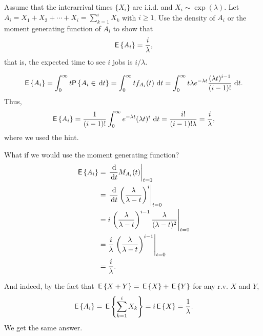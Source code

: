   \begin{question}
    Assume that the interarrival times $\{X_i\}$ are i.i.d. and
    $X_i\sim\exp(\lambda)$. Let
    $A_i=X_1+X_2+\cdots+X_i=\sum_{k=1}^i X_k$ with $i\geq 1$. Use the
    density of $A_i$ or the moment generating function of $A_i$ to
    show that
 \begin{equation*}
\,\mathsf{E}\left\{A_i\right\} = \frac i\lambda,
 \end{equation*}
 that is, the expected time to see $i$ jobs is $i/\lambda$.
  \begin{solution}
  \begin{equation*}
\E{A_i} = \int_0^\infty t \P{A_i \in \d t} = \int_0^\infty t f_{A_i} (t) \, \d t  = 
\int_0^\infty t  \lambda e^{-\lambda t} \frac{(\lambda t)^{i-1}}{(i-1)!}\, \d t.
  \end{equation*}
Thus, 
  \begin{equation*}
\,\mathsf{E}\left\{A_i\right\} = \frac{1}{(i-1)!} \int_0^\infty   e^{-\lambda t} (\lambda t)^i\,\,\text{d}t = \frac{i!}{(i-1)!\lambda}=\frac{i}\lambda,
  \end{equation*}
  where we used the hint.

What if we would use the moment generating function? 
\begin{equation*}
  \begin{split}
    \E{A_i} 
&= \left.\frac{\d}{\d t} M_{A_i}(t)\right|_{t=0} \\
&= \left.\frac{\d}{\d t} \left(\frac{\lambda}{\lambda-t}\right)^i\right|_{t=0} \\
&= i \left.\left(\frac{\lambda}{\lambda-t}\right)^{i-1}\frac{\lambda}{(\lambda-t)^2}\right|_{t=0} \\
&= \frac i\lambda \left.\left(\frac{\lambda}{\lambda-t}\right)^{i-1}\right|_{t=0} \\
&= \frac i\lambda.
  \end{split}
\end{equation*}

And indeed, by the fact that $\,\mathsf{E}\left\{X+Y\right\}= \,\mathsf{E}\left\{X\right\} + \,\mathsf{E}\left\{Y\right\}$ for any r.v. $X$ and $Y$,
\begin{equation*}
\,\mathsf{E}\left\{A_i\right\} = \,\mathsf{E}\left\{\sum_{k=1}^i X_k\right\} = i \,\mathsf{E}\left\{X\right\} = \frac 1 \lambda.
\end{equation*}
We get the same answer. 
  \end{solution}
\end{question}


